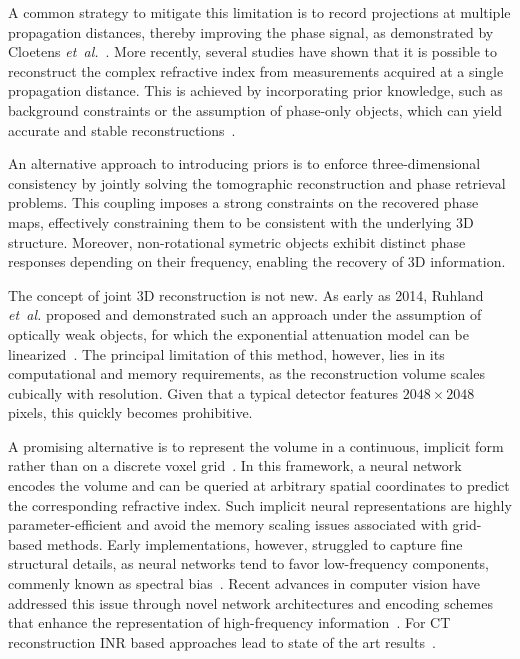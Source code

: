 \documentclass{article}
\begin{document}
A common strategy to mitigate this limitation is to record projections at multiple propagation distances, thereby improving the phase signal, as demonstrated by Cloetens \textit{et~al.}~\cite{cloetensHolotomographyQuantitativePhase1999a}.
More recently, several studies have shown that it is possible to reconstruct the complex refractive index from measurements acquired at a single propagation distance.
This is achieved by incorporating prior knowledge, such as background constraints or the assumption of phase-only objects, which can yield accurate and stable reconstructions~\cite{doraArtifactsuppressingReconstructionStrongly2024,fienupReconstructionSupportObject1982,wittwerPhaseRetrievalFramework2022}.

An alternative approach to introducing priors is to enforce three-dimensional consistency by jointly solving the tomographic reconstruction and phase retrieval problems.
This coupling imposes a strong constraints on the recovered phase maps, effectively constraining them to be consistent with the underlying 3D structure.
Moreover, non-rotational symetric objects exhibit distinct phase responses depending on their frequency, enabling the recovery of 3D information.

The concept of joint 3D reconstruction is not new.
As early as 2014, Ruhland \textit{et~al.} proposed and demonstrated such an approach under the assumption of optically weak objects, for which the exponential attenuation model can be linearized~\cite{ruhlandtThreedimensionalPhaseRetrieval2014,ruhlandtThreedimensionalPropagationNearfield2016a}.
The principal limitation of this method, however, lies in its computational and memory requirements, as the reconstruction volume scales cubically with resolution.
Given that a typical detector features $2048 \times 2048$ pixels, this quickly becomes prohibitive.

A promising alternative is to represent the volume in a continuous, implicit form rather than on a discrete voxel grid~\cite{mildenhallNeRFRepresentingScenes2020a}.
In this framework, a neural network encodes the volume and can be queried at arbitrary spatial coordinates to predict the corresponding refractive index.
Such implicit neural representations are highly parameter-efficient and avoid the memory scaling issues associated with grid-based methods.
Early implementations, however, struggled to capture fine structural details, as neural networks tend to favor low-frequency components, commenly known as spectral bias~\cite{rahamanSpectralBiasNeural2019}.
Recent advances in computer vision have addressed this issue through novel network architectures and encoding schemes that enhance the representation of high-frequency information~\cite{mildenhallNeRFRepresentingScenes2020a,mullerInstantNeuralGraphics2022}.
For CT reconstruction INR based approaches lead to state of the art results~\cite{essakineWhereWeStand2025,zhaNAFNeuralAttenuation2022a}.
\end{document}
